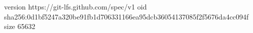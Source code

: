 version https://git-lfs.github.com/spec/v1
oid sha256:0d1bf5247a320be91fb1d706331166ea95dcb36054137085f2f5676da4cc094f
size 65632
